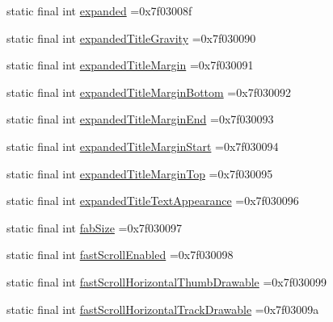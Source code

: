 \begin{DoxyCompactItemize}
\item 
static final int \mbox{\hyperlink{classbr_1_1unb_1_1cic_1_1mp_1_1marketmaster_1_1test_1_1R_1_1attr_afc9a6e5b4f83abbc88134bd8e1d9bcfc}{expanded}} =0x7f03008f
\item 
static final int \mbox{\hyperlink{classbr_1_1unb_1_1cic_1_1mp_1_1marketmaster_1_1test_1_1R_1_1attr_a52f727d36262221bd2abf0c3a0ac7d56}{expanded\+Title\+Gravity}} =0x7f030090
\item 
static final int \mbox{\hyperlink{classbr_1_1unb_1_1cic_1_1mp_1_1marketmaster_1_1test_1_1R_1_1attr_a1b3e66b2b5e10155ee667ce0c5e27f1a}{expanded\+Title\+Margin}} =0x7f030091
\item 
static final int \mbox{\hyperlink{classbr_1_1unb_1_1cic_1_1mp_1_1marketmaster_1_1test_1_1R_1_1attr_a7a10fceb15a03dafc44553347186dd1b}{expanded\+Title\+Margin\+Bottom}} =0x7f030092
\item 
static final int \mbox{\hyperlink{classbr_1_1unb_1_1cic_1_1mp_1_1marketmaster_1_1test_1_1R_1_1attr_a898cd44dc665c3f058171105143b2749}{expanded\+Title\+Margin\+End}} =0x7f030093
\item 
static final int \mbox{\hyperlink{classbr_1_1unb_1_1cic_1_1mp_1_1marketmaster_1_1test_1_1R_1_1attr_adc05df5652e5c2bae4b2787919992427}{expanded\+Title\+Margin\+Start}} =0x7f030094
\item 
static final int \mbox{\hyperlink{classbr_1_1unb_1_1cic_1_1mp_1_1marketmaster_1_1test_1_1R_1_1attr_a58dbac561909d49786f73e8d94921206}{expanded\+Title\+Margin\+Top}} =0x7f030095
\item 
static final int \mbox{\hyperlink{classbr_1_1unb_1_1cic_1_1mp_1_1marketmaster_1_1test_1_1R_1_1attr_a3c7e40570d75c85142e8f6e8e5a9c640}{expanded\+Title\+Text\+Appearance}} =0x7f030096
\item 
static final int \mbox{\hyperlink{classbr_1_1unb_1_1cic_1_1mp_1_1marketmaster_1_1test_1_1R_1_1attr_a96347ca48df2ec6a2422c115c9193015}{fab\+Size}} =0x7f030097
\item 
static final int \mbox{\hyperlink{classbr_1_1unb_1_1cic_1_1mp_1_1marketmaster_1_1test_1_1R_1_1attr_a3f1785c5ed9c0b6fcc4dc419938f2938}{fast\+Scroll\+Enabled}} =0x7f030098
\item 
static final int \mbox{\hyperlink{classbr_1_1unb_1_1cic_1_1mp_1_1marketmaster_1_1test_1_1R_1_1attr_a2dbd02444636f14538d42fbe6fc0e969}{fast\+Scroll\+Horizontal\+Thumb\+Drawable}} =0x7f030099
\item 
static final int \mbox{\hyperlink{classbr_1_1unb_1_1cic_1_1mp_1_1marketmaster_1_1test_1_1R_1_1attr_ac64af05e0835f45dfcbd2c9a707eafb6}{fast\+Scroll\+Horizontal\+Track\+Drawable}} =0x7f03009a

\end{DoxyCompactItemize}
